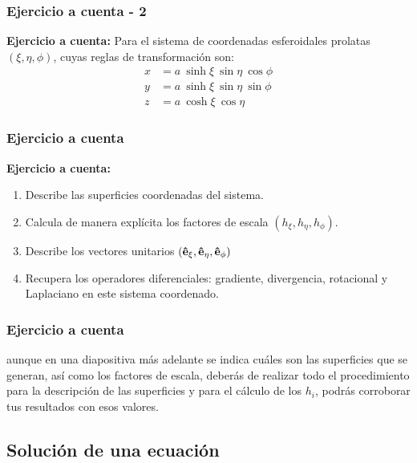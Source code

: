 \documentclass[12pt]{beamer}
\begin{document}
\begin{frame}
\frametitle{Ejercicio a cuenta - 2}
\textbf{Ejercicio a cuenta: } 
Para el sistema de coordenadas esferoidales prolatas $(\xi, \eta, \phi)$, cuyas reglas de transformación son:
\begin{align*}
x &= a \: \sinh \xi \: \sin \eta \: \cos \phi\\
y &= a \: \sinh \xi \: \sin \eta \: \sin \phi\\
z &= a \: \cosh \xi \: \cos \eta
\end{align*}
\end{frame}
\begin{frame}
\frametitle{Ejercicio a cuenta}
\textbf{Ejercicio a cuenta: } 
\begin{enumerate}[<+->]
\item Describe las superficies coordenadas del sistema.
\item Calcula de manera explícita los factores de escala $(h_{\xi}, h_{\eta}, h_{\phi})$.
\item Describe los vectores unitarios $(\vu{e}_{\xi}, \vu{e}_{\eta}, \vu{e}_{\phi})$
\item Recupera los operadores diferenciales: gradiente, divergencia, rotacional y Laplaciano en este sistema coordenado.
\end{enumerate}
\end{frame}
\begin{frame}
\frametitle{Ejercicio a cuenta}
 aunque en una diapositiva más adelante se indica cuáles son las superficies que se generan, así como los factores de escala, deberás de realizar todo el procedimiento para la descripción de las superficies y para el cálculo de los $h_{i}$, podrás corroborar tus resultados con esos valores.
\end{frame}

\subsection{Solución de una ecuación}
\end{document}
